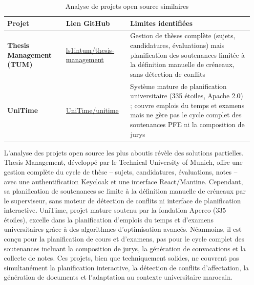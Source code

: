 \begin{table}[H]
    \centering
    \small
    \begin{xltabular}{\textwidth}{lXX}
        \toprule

        \textbf{Projet}                  & \textbf{Lien GitHub}                                                             & \textbf{Limites identifiées}                                            \\
        \midrule
        \textbf{Thesis Management (TUM)} & \href{https://github.com/ls1intum/thesis-management}{ls1intum/thesis-management} &
        Gestion de thèses complète (sujets, candidatures, évaluations) mais planification des soutenances limitée à la définition manuelle de créneaux, sans détection de conflits                    \\
        \addlinespace
        \textbf{UniTime}                 & \href{https://github.com/UniTime/unitime}{UniTime/unitime}                       &
        Système mature de planification universitaire (335 étoiles, Apache 2.0) ; couvre emplois du temps et examens mais ne gère pas le cycle complet des soutenances PFE ni la composition de jurys \\
        \bottomrule
    \end{xltabular}
    \caption{Analyse de projets open source similaires}
    \label{tab:opensource}
\end{table}

L'analyse des projets open source les plus aboutis révèle des solutions partielles. Thesis Management, développé par le Technical University of Munich, offre une gestion complète du cycle de thèse -- sujets, candidatures, évaluations, notes -- avec une authentification Keycloak et une interface React/Mantine. Cependant, sa planification de soutenances se limite à la définition manuelle de créneaux par le superviseur, sans moteur de détection de conflits ni interface de planification interactive. UniTime, projet mature soutenu par la fondation Apereo (335 étoiles), excelle dans la planification d'emplois du temps et d'examens universitaires grâce à des algorithmes d'optimisation avancés. Néanmoins, il est conçu pour la planification de cours et d'examens, pas pour le cycle complet des soutenances incluant la composition de jurys, la génération de convocations et la collecte de notes. Ces projets, bien que techniquement solides, ne couvrent pas simultanément la planification interactive, la détection de conflits d'affectation, la génération de documents et l'adaptation au contexte universitaire marocain.

